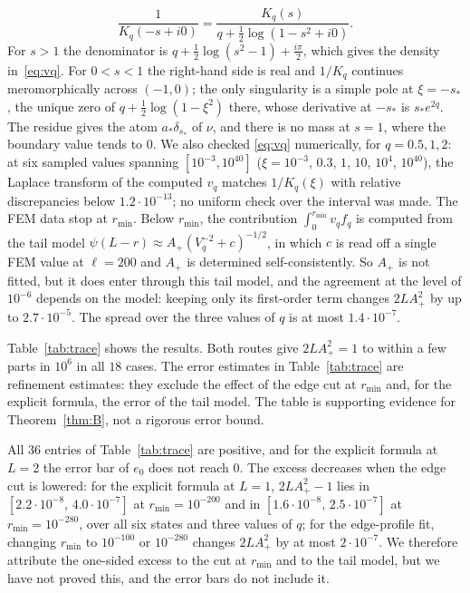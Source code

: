 \documentclass[11pt]{amsart}
\newcommand{\e}[1]{\cdot 10^{#1}}
\theoremstyle{definition}
\theoremstyle{remark}
\numberwithin{equation}{section}
\begin{document}
\begin{enumerate}
\[
\frac1{K_q(-s+i0)}=\frac{K_q(s)}{q+\frac12\log(1-s^2+i0)}.
\]
For $s>1$ the denominator is $q+\frac12\log(s^2-1)+\frac{i\pi}2$, which gives the density in~\eqref{eq:vq}. For $0<s<1$ the right-hand side is real and $1/K_q$ continues meromorphically across $(-1,0)$; the only singularity is a simple pole at $\xi=-s_*$, the unique zero of $q+\frac12\log(1-\xi^2)$ there, whose derivative at $-s_*$ is $s_*e^{2q}$. The residue gives the atom $a_*\delta_{s_*}$ of $\nu$, and there is no mass at $s=1$, where the boundary value tends to $0$. We also checked \eqref{eq:vq} numerically, for $q=0.5,1,2$: at six sampled values spanning $[10^{-3},10^{40}]$ ($\xi=10^{-3}$, $0.3$, $1$, $10$, $10^4$, $10^{40}$), the Laplace transform of the computed $v_q$ matches $1/K_q(\xi)$ with relative discrepancies below $1.2\e{-13}$; no uniform check over the interval was made. The FEM data stop at $r_{\min}$. Below $r_{\min}$, the contribution $\int_0^{r_{\min}}v_qf_q$ is computed from the tail model $\psi(L-r)\approx A_+(V_q^{-2}+c)^{-1/2}$, in which $c$ is read off a single FEM value at $\ell=200$ and $A_+$ is determined self-consistently. So $A_+$ is not fitted, but it does enter through this tail model, and the agreement at the level of $10^{-6}$ depends on the model: keeping only its first-order term changes $2LA_+^2$ by up to $2.7\e{-5}$. The spread over the three values of $q$ is at most $1.4\e{-7}$.
\end{enumerate}
Table~\ref{tab:trace} shows the results. Both routes give $2LA_+^2=1$ to within a few parts in $10^6$ in all $18$ cases. The error estimates in Table~\ref{tab:trace} are refinement estimates: they exclude the effect of the edge cut at $r_{\min}$ and, for the explicit formula, the error of the tail model. The table is supporting evidence for Theorem~\ref{thm:B}, not a rigorous error bound.

All $36$ entries of Table~\ref{tab:trace} are positive, and for the explicit formula at $L=2$ the error bar of $e_0$ does not reach $0$. The excess decreases when the edge cut is lowered: for the explicit formula at $L=1$, $2LA_+^2-1$ lies in $[2.2\e{-8},\,4.0\e{-7}]$ at $r_{\min}=10^{-200}$ and in $[1.6\e{-8},\,2.5\e{-7}]$ at $r_{\min}=10^{-280}$, over all six states and three values of $q$; for the edge-profile fit, changing $r_{\min}$ to $10^{-100}$ or $10^{-280}$ changes $2LA_+^2$ by at most $2\e{-7}$. We therefore attribute the one-sided excess to the cut at $r_{\min}$ and to the tail model, but we have not proved this, and the error bars do not include it.
\end{document}
